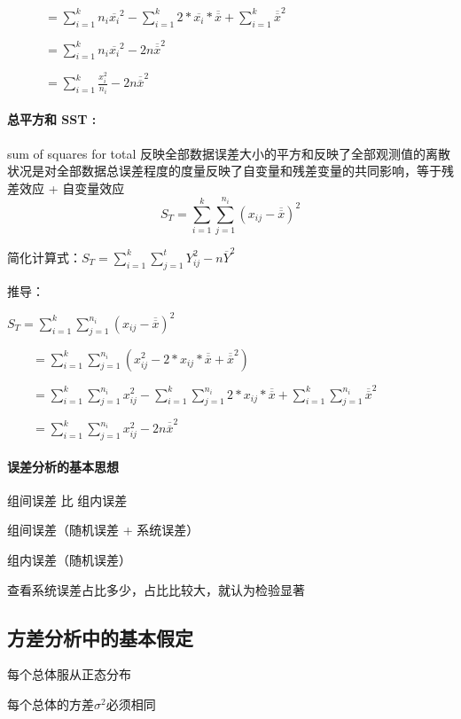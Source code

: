 \documentclass[UTF8,10pt]{book}
\begin{document}
    $\quad \quad \quad = \sum_{i=1}^k n_i \overline{x_i}^2 - \sum_{i=1}^k 2*\overline{x_i} * \overline{\overline{x}} +\sum_{i=1}^k \overline{\overline{x}}^2$ 
    
    $\quad \quad \quad = \sum_{i=1}^k n_i \overline{x_i}^2 - 2n\overline{\overline{x}}^2$ 
    
    $\quad \quad \quad = \sum_{i=1}^k \frac{ x_i^2}{n_i} - 2n\overline{\overline{x}}^2 $

    \paragraph{总平方和 SST :} sum of squares for total	反映全部数据误差大小的平方和反映了全部观测值的离散状况是对全部数据总误差程度的度量反映了自变量和残差变量的共同影响，等于残差效应 + 自变量效应$$ S_T = \sum_{i=1}^k \sum_{j=1}^{n_i} \left(x_{ij} - \overline{\overline{x}} \right)^2 $$ 
    
    简化计算式：$ S_T = \sum_{i=1}^k \sum_{j=1}^{t} Y_{ij}^2 - n \overline{Y}^2 $ 
    
    推导： 
    
    $ S_T = \sum_{i=1}^k \sum_{j=1}^{n_i} \left(x_{ij} - \overline{\overline{x}} \right)^2 $ 
    
    $ \quad \quad = \sum_{i=1}^k \sum_{j=1}^{n_i} \left( x_{ij}^2 - 2*x_{ij}* \overline{\overline{x}} + \overline{\overline{x}}^2 \right)$ 
    
    $ \quad \quad = \sum_{i=1}^k \sum_{j=1}^{n_i} x_{ij}^2 -\sum_{i=1}^k \sum_{j=1}^{n_i} 2*x_{ij}* \overline{\overline{x}} + \sum_{i=1}^k \sum_{j=1}^{n_i} \overline{\overline{x}}^2 $ 
    
    $ \quad \quad = \sum_{i=1}^k \sum_{j=1}^{n_i} x_{ij}^2 - 2n\overline{\overline{x}}^2$

    \paragraph{误差分析的基本思想}	组间误差 比 组内误差 
    
    组间误差（随机误差 + 系统误差）
    
    组内误差（随机误差） 
    
    查看系统误差占比多少，占比比较大，就认为检验显著

\subsection{方差分析中的基本假定}	
每个总体服从正态分布

每个总体的方差$\sigma^2$必须相同
\end{document}
